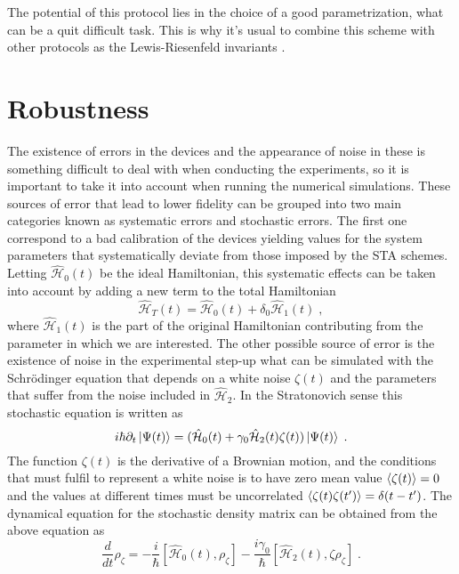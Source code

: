 The potential of this protocol lies in the choice of a good parametrization, what can be a quit difficult task. This is why it's usual to combine this scheme with other protocols as the Lewis-Riesenfeld invariants \cite{Lewis1969}. 

\section{Robustness}
The existence of errors in the devices and the appearance of noise in these is something difficult to deal with when conducting the experiments, so it is important to take it into account when running the numerical simulations. These sources of error that lead to lower fidelity can be grouped into two main categories known as systematic errors and stochastic errors. The first one correspond to a bad calibration of the devices yielding values for the system parameters that systematically deviate from those imposed by the STA schemes. Letting $\hat{\mathcal{H}}_0(t)$ be the ideal Hamiltonian, this systematic effects can be taken into account by adding a new term to the total Hamiltonian
\begin{equation}
	\hat{\mathcal{H}}_T(t)=\hat{\mathcal{H}}_0(t)+\delta_0\hat{\mathcal{H}}_1(t)\; ,
\end{equation}
where $\hat{\mathcal{H}}_1(t)$ is the part of the original Hamiltonian contributing from the parameter in which we are interested. The other possible source of error is the existence of noise in the experimental step-up what can be simulated with the Schrödinger equation that depends on a white noise $\zeta(t)$ and the parameters that suffer from the noise included in $\hat{\mathcal{H}}_2$. In the Stratonovich sense this stochastic equation is written as
\begin{equation}
	i\hbar \partial_t\ket{\Psi(t)}=(\hat{\mathcal{H}}_0(t)+\gamma_0\hat{\mathcal{H}}_2(t)\zeta(t))\ket{\Psi(t)}\; .
\end{equation}
The function $\zeta(t)$ is the derivative of a Brownian motion, and the conditions that must fulfil to represent a white noise is to have zero mean value $\expval{\zeta(t)}=0$ and the values at different times must be uncorrelated $\expval{\zeta(t)\zeta(t')}=\delta(t-t')$. The dynamical equation for the stochastic density matrix can be obtained from the above equation as
\begin{equation}
	\frac{d}{dt}\rho_\zeta=-\frac{i}{\hbar}[\hat{\mathcal{H}}_0(t),\rho_\zeta]-\frac{i\gamma_0}{\hbar}[\hat{\mathcal{H}}_2(t),\zeta\rho_\zeta]\; .
	\label{eq:stochastic_dynamics}
\end{equation}
